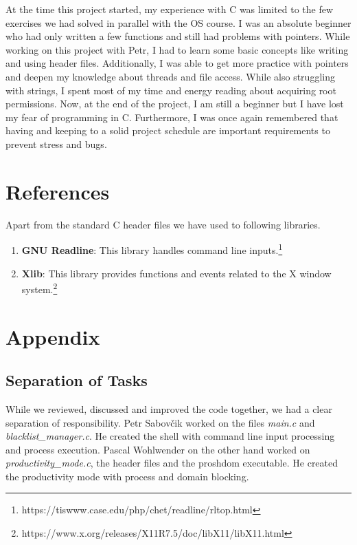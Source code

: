 \documentclass{article}
\begin{document}
At the time this project started, my experience with C was limited to the few exercises we had solved in parallel with the OS course. I was an absolute beginner who had only written a few functions and still had problems with pointers. While working on this project with Petr, I had to learn some basic concepts like writing and using header files. Additionally, I was able to get more practice with pointers and deepen my knowledge about threads and file access. While also struggling with strings, I spent most of my time and energy reading about acquiring root permissions. Now, at the end of the project, I am still a beginner but I have lost my fear of programming in C. Furthermore, I was once again remembered that having and keeping to a solid project schedule are important requirements to prevent stress and bugs.

\section{References}

Apart from the standard C header files we have used to following libraries.

\begin{enumerate}
	\item \textbf{GNU Readline}: This library handles command line inputs.\footnote{https://tiswww.case.edu/php/chet/readline/rltop.html}
	\item \textbf{Xlib}: This library provides functions and events related to the X window system.\footnote{https://www.x.org/releases/X11R7.5/doc/libX11/libX11.html}
\end{enumerate}

\pagebreak

\section{Appendix}

\subsection{Separation of Tasks}

While we reviewed, discussed and improved the code together, we had a clear separation of responsibility. Petr Sabovčik worked on the files \textit{main.c} and \textit{blacklist\_manager.c}. He created the shell with command line input processing and process execution. Pascal Wohlwender on the other hand worked on \textit{productivity\_mode.c}, the header files and the proshdom executable. He created the productivity mode with process and domain blocking.
\end{document}
